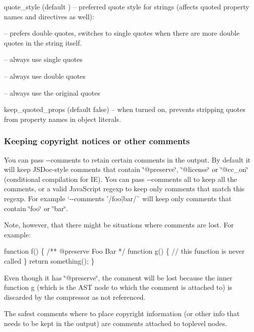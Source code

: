 \begin{DoxyItemize}
\item {\ttfamily quote\+\_\+style} (default {}) -- preferred quote style for strings (affects quoted property names and directives as well)\+:
\begin{DoxyItemize}
\item {} -- prefers double quotes, switches to single quotes when there are more double quotes in the string itself.
\item {} -- always use single quotes
\item {} -- always use double quotes
\item {} -- always use the original quotes
\end{DoxyItemize}
\item {\ttfamily keep\+\_\+quoted\+\_\+props} (default {\ttfamily false}) -- when turned on, prevents stripping quotes from property names in object literals.
\end{DoxyItemize}

\subsubsection*{Keeping copyright notices or other comments}

You can pass {\ttfamily -\/-\/comments} to retain certain comments in the output. By default it will keep J\+S\+Doc-\/style comments that contain \char`\"{}@preserve\char`\"{}, \char`\"{}@license\char`\"{} or \char`\"{}@cc\+\_\+on\char`\"{} (conditional compilation for IE). You can pass {\ttfamily -\/-\/comments all} to keep all the comments, or a valid Java\+Script regexp to keep only comments that match this regexp. For example `-\/-\/comments '/foo$\vert$bar/\textquotesingle{}\`{} will keep only comments that contain \char`\"{}foo\char`\"{} or \char`\"{}bar\char`\"{}.

Note, however, that there might be situations where comments are lost. For example\+: 
\begin{DoxyCode}
function f() \{
    /** @preserve Foo Bar */
    function g() \{
      // this function is never called
    \}
    return something();
\}
\end{DoxyCode}


Even though it has \char`\"{}@preserve\char`\"{}, the comment will be lost because the inner function {\ttfamily g} (which is the A\+ST node to which the comment is attached to) is discarded by the compressor as not referenced.

The safest comments where to place copyright information (or other info that needs to be kept in the output) are comments attached to toplevel nodes.


